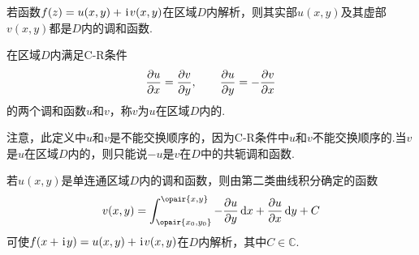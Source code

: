 \begin{theorem}
若函数\(f(z)=u(x,y)+\kern1pt\mathrm{i}\kern1pt v(x,y)\)在区域\(D\)内解析，则其实部\(u(x,y)\)及其虚部\(v(x,y)\)都是\(D\)内的调和函数.
\end{theorem}

\begin{definition}
在区域\(D\)内满足C-R条件\[
\pdv{u}{x}=\pdv{v}{y}, \qquad \pdv{u}{y}=-\pdv{v}{x}
\]的两个调和函数\(u\)和\(v\)，称\(v\)为\(u\)在区域\(D\)内的.
\end{definition}
注意，此定义中\(u\)和\(v\)是不能交换顺序的，因为C-R条件中\(u\)和\(v\)不能交换顺序的.当\(v\)是\(u\)在区域\(D\)内的，则只能说\(-u\)是\(v\)在\(D\)中的共轭调和函数.

\begin{theorem}
若\(u(x,y)\)是单连通区域\(D\)内的调和函数，则由第二类曲线积分确定的函数\[
v(x,y)=\int_{\opair{x_0,y_0}}^{\opair{x,y}}
-\pdv{u}{y} \dd{x} + \pdv{u}{x} \dd{y} + C
\]可使\(f(x+\kern1pt\mathrm{i}\kern1pt y)=u(x,y)+\kern1pt\mathrm{i}\kern1pt v(x,y)\)在\(D\)内解析，其中\(C\in\mathbb{C}\).
\end{theorem}
